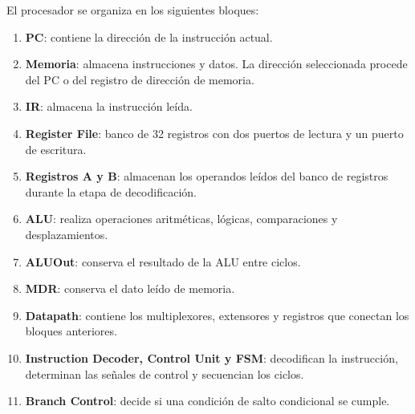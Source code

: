 \documentclass[11pt,a4paper]{article}
\begin{document}
El procesador se organiza en los siguientes bloques:
\begin{enumerate}
  \item \textbf{PC}: contiene la dirección de la instrucción actual.
  \item \textbf{Memoria}: almacena instrucciones y datos. La dirección seleccionada procede del PC o del registro de dirección de memoria.
  \item \textbf{IR}: almacena la instrucción leída.
  \item \textbf{Register File}: banco de 32 registros con dos puertos de lectura y un puerto de escritura.
  \item \textbf{Registros A y B}: almacenan los operandos leídos del banco de registros durante la etapa de decodificación.
  \item \textbf{ALU}: realiza operaciones aritméticas, lógicas, comparaciones y desplazamientos.
  \item \textbf{ALUOut}: conserva el resultado de la ALU entre ciclos.
  \item \textbf{MDR}: conserva el dato leído de memoria.
  \item \textbf{Datapath}: contiene los multiplexores, extensores y registros que conectan los bloques anteriores.
  \item \textbf{Instruction Decoder, Control Unit y FSM}: decodifican la instrucción, determinan las señales de control y secuencian los ciclos.
  \item \textbf{Branch Control}: decide si una condición de salto condicional se cumple.
\end{enumerate}
\end{document}
